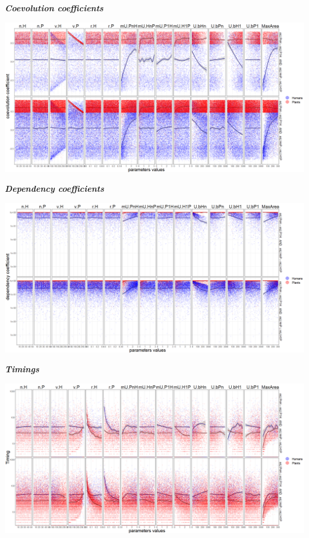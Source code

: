 \documentclass[]{book}
\begin{document}
\textbf{\emph{Coevolution coefficients}}

\includegraphics[width=1\linewidth]{plots/5_multiplePar-coevo-bothLessBase-ggplot}

\textbf{\emph{Dependency coefficients}}

\includegraphics[width=1\linewidth]{plots/5_multiplePar-depend-bothLessBase-ggplot}

\textbf{\emph{Timings}}

\includegraphics[width=1\linewidth]{plots/5_multiplePar-timing-bothLessBase-ggplot}
\end{document}
